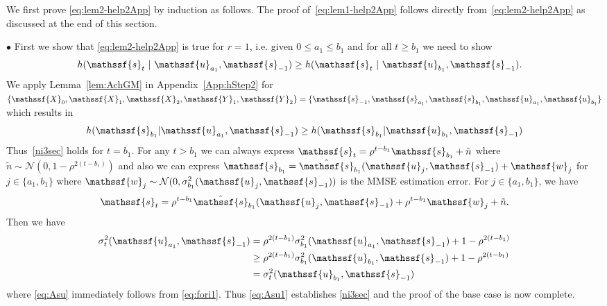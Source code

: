 \documentclass[journal, twocolumn, 10pt]{IEEEtran}
\newcommand{\cN}{{\mathcal{N}}}
\newcommand{\rvX}{{\mathssf{X}}}    %
\newcommand{\rvY}{{\mathssf{Y}}}    %
\newcommand{\rvs}{{\mathssf{s}}}    %
\newcommand{\rvu}{{\mathssf{u}}}    %
\newcommand{\rvw}{{\mathssf{w}}}    %
\begin{document}
{We first prove \eqref{eq:lem2-help2App} by induction as follows. The proof of~\eqref{eq:lem1-help2App}  follows directly from~\eqref{eq:lem2-help2App} as discussed at the end of this section. 


$\bullet$ First we show that \eqref{eq:lem2-help2App} is true for $r=1$,  i.e. given $0\le a_1\le b_1$ and for all $t\ge b_1$ we need to show 
\begin{align}
&h(\rvs_{t}~|~ \rvu_{a_{1}}, \rvs_{-1}) \ge h(\rvs_{t}~|~ \rvu_{b_{1}}, \rvs_{-1}).\label{ni3sec}
\end{align} We apply Lemma~\ref{lem:AchGM} in Appendix~\ref{App:hStep2} for $\{\rvX_{0}, \rvX_{1}, \rvX_{2}, \rvY_1, \rvY_2\}= \{\rvs_{-1}, \rvs_{a_1}, \rvs_{b_1}, \rvu_{a_1}, \rvu_{b_1}\}$ which results in 
\begin{align}
h(\rvs_{b_1}|\rvu_{a_1}, \rvs_{-1}) \ge h(\rvs_{b_1}|\rvu_{b_1}, \rvs_{-1}) \label{eq:fori1}
\end{align} Thus~\eqref{ni3sec} holds for $t=b_1$. For any $t > b_1$ we can always express $\rvs_{t} = \rho^{t-b_1}\rvs_{b_1} +\tilde{n}$ where $\tilde{n} \sim \cN(0,1- \rho^{2(t-b_1)})$ and also we can express $\rvs_{b_1} = \hat{\rvs}_{b_1} (\rvu_{j}, \rvs_{-1}) + \rvw_j$ for $j\in \{a_1 , b_1\}$ where $\rvw_j \sim \cN(0, \sigma^2_{b_1}(\rvu_{j}, \rvs_{-1}))$ is the MMSE estimation error. For $j\in\{a_1, b_1\}$, we have
\begin{align}
\rvs_{t} = \rho^{t-b_1} \hat{\rvs}_{b_1}(\rvu_{j}, \rvs_{-1}) + \rho^{t-b_1} \rvw_{j} + \tilde{n}.
\end{align} Then we have
\begin{align}
\sigma^2_t(\rvu_{a_1}, \rvs_{-1}) &= \rho^{2(t-b_1)} \sigma^2_{b_1}(\rvu_{a_1}, \rvs_{-1}) + 1- \rho^{2(t-b_1)}\\
&\ge \rho^{2(t-b_1)} \sigma^2_{b_1}(\rvu_{b_1}, \rvs_{-1}) + 1- \rho^{2(t-b_1)} \label{eq:Asu}\\
&= \sigma^2_t(\rvu_{b_1}, \rvs_{-1})\label{eq:Asu1}
\end{align}  where \eqref{eq:Asu} immediately follows from \eqref{eq:fori1}. Thus \eqref{eq:Asu1} establishes \eqref{ni3sec} and the proof of the base case is now complete.

}
\end{document}

